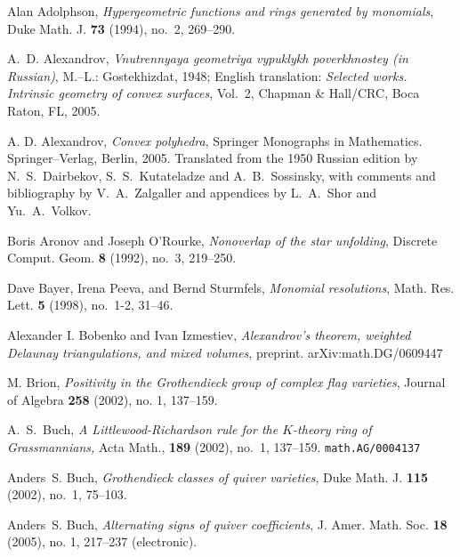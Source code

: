 \documentclass[11pt]{proposal}
\def\refname{{\Large \bf References}}
\def\bibsec#1{\item[#1]\vspace{.5ex}\item[]\vspace{-2.5ex}}
\def\K{{$K$}}
\begin{document}
%
%
\renewcommand\refname{}
\begin{thebibliography}{Mat01b}


\bibsec{\textbf{Cited publications by other authors}}%

Alan Adolphson, \emph{Hypergeometric functions and rings generated by
  monomials}, Duke Math. J. \textbf{73} (1994), no.~2, 269--290.

A.~D. Alexandrov, \emph{Vnutrennyaya geometriya vypuklykh
  poverkhnostey {\rm (in Russian)}}, {\mbox{M.--L.}: Gostekhizdat},
  1948; English translation: \emph{Selected works. Intrinsic geometry
  of convex surfaces}, Vol.~2, Chapman \& Hall/CRC, Boca Raton, FL, 2005.

A. D. Alexandrov, \emph{Convex polyhedra}, Springer Monographs in
  Mathematics.  Springer--Verlag, Berlin, 2005.  Translated from the
  1950 Russian edition by N.~S.~Dairbekov, S.~S.~Kutateladze and
  A.~B.~Sossinsky, with comments and bibliography by V.~A.~Zalgaller
  and appendices by L.~A.~Shor and Yu.~A.~Volkov.

Boris Aronov and Joseph O'Rourke, \emph{Nonoverlap of the star
  unfolding}, Discrete Comput. Geom. \textbf{8} (1992), no.~3,
  219--250.

Dave Bayer, Irena Peeva, and Bernd Sturmfels, \emph{Monomial
  resolutions}, Math. Res. Lett. \textbf{5} (1998), no.~1-2, 31--46.

Alexander I. Bobenko and Ivan Izmestiev, \emph{Alexandrov's theorem,
  weighted Delaunay triangulations, and mixed volumes}, preprint.
  \textsf{arXiv:math.DG/0609447}

M. Brion, \emph{Positivity in the Grothendieck group of complex flag
  varieties}, Journal of Algebra \textbf{258} (2002), no. 1,
  137--159.

A.~S.~Buch, \emph{A Littlewood-Richardson rule for the \K-theory ring
  of Grassmannians,} Acta Math., {\bf 189} (2002), no.~1, 137--159.
  \texttt{math.AG/0004137}

Anders~S. Buch, \emph{Grothendieck classes of quiver varieties},
  Duke Math. J. \textbf{115} (2002), no.~1, 75--103.

Anders~S. Buch, \emph{Alternating signs of quiver coefficients},
  J. Amer. Math. Soc. \textbf{18} (2005), no. 1, 217--237 (electronic). 


\end{thebibliography}
\end{document}
